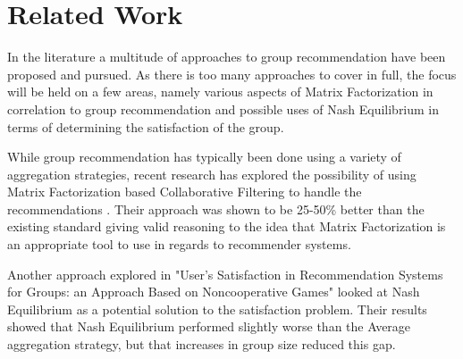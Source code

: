 \section{Related Work} \label{in:related_work}

In the literature a multitude of approaches to group recommendation have been proposed and pursued. As there is too many approaches to cover in full, the focus will be held on a few areas, namely various aspects of Matrix Factorization in correlation to group recommendation and possible uses of Nash Equilibrium in terms of determining the satisfaction of the group.

While group recommendation has typically been done using a variety of aggregation strategies, recent research has explored the possibility of using Matrix Factorization based Collaborative Filtering to handle the recommendations \cite{mfbasedcf}. Their approach was shown to be 25-50\% better than the existing standard giving valid reasoning to the idea that Matrix Factorization is an appropriate tool to use in regards to recommender systems.

Another approach explored in "User’s Satisfaction in Recommendation Systems for Groups: an Approach Based on Noncooperative Games"\cite{nashequilibrium} looked at Nash Equilibrium as a potential solution to the satisfaction problem. Their results showed that Nash Equilibrium performed slightly worse than the Average aggregation strategy, but that increases in group size reduced this gap.